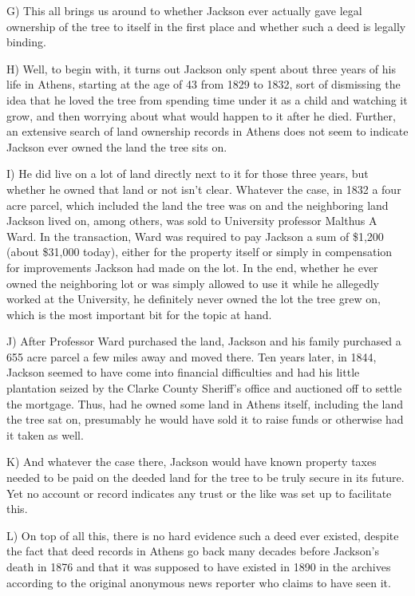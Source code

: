 \documentclass[UTF8,11pt]{ctexart}
\begin{document}
G) This all brings us around to whether Jackson ever actually gave legal ownership of the tree to itself in the first place and whether such a deed is legally binding.


H) Well, to begin with, it turns out Jackson only spent about three years of his life in Athens, starting at the age of 43 from 1829 to 1832, sort of dismissing the idea that he loved the tree from spending time under it as a child and watching it grow, and then worrying about what would happen to it after he died. Further, an extensive search of land ownership records in Athens does not seem to indicate Jackson ever owned the land the tree sits on.


I) He did live on a lot of land directly next to it for those three years, but whether he owned that land or not isn’t clear. Whatever the case, in 1832 a four acre parcel, which included the land the tree was on and the neighboring land Jackson lived on, among others, was sold to University professor Malthus A Ward. In the transaction, Ward was required to pay Jackson a sum of \$1,200 (about \$31,000 today), either for the property itself or simply in compensation for improvements Jackson had made on the lot. In the end, whether he ever owned the neighboring lot or was simply allowed to use it while he allegedly worked at the University, he definitely never owned the lot the tree grew on, which is the most important bit for the topic at hand.


J) After Professor Ward purchased the land, Jackson and his family purchased a 655 acre parcel a few miles away and moved there. Ten years later, in 1844, Jackson seemed to have come into financial difficulties and had his little plantation seized by the Clarke County Sheriff’s office and auctioned off to settle the mortgage. Thus, had he owned some land in Athens itself, including the land the tree sat on, presumably he would have sold it to raise funds or otherwise had it taken as well.


K) And whatever the case there, Jackson would have known property taxes needed to be paid on the deeded land for the tree to be truly secure in its future. Yet no account or record indicates any trust or the like was set up to facilitate this.


L) On top of all this, there is no hard evidence such a deed ever existed, despite the fact that deed records in Athens go back many decades before Jackson’s death in 1876 and that it was supposed to have existed in 1890 in the archives according to the original anonymous news reporter who claims to have seen it.
\end{document}
